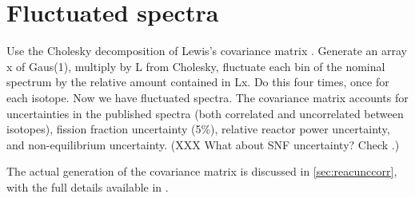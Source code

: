 \documentclass[../thesis.tex]{subfiles}
\begin{document}
\section{Fluctuated spectra}
\label{sec:reactoyFluct}

Use the Cholesky decomposition of Lewis's covariance matrix
\cite{Lewis}. Generate an array x of Gaus(1), multiply by L from Cholesky,
fluctuate each bin of the nominal spectrum by the relative amount contained in
Lx. Do this four times, once for each isotope. Now we have fluctuated
spectra. The covariance matrix accounts for uncertainties in the published
spectra (both correlated and uncorrelated between isotopes), fission fraction
uncertainty (5\%), relative reactor power uncertainty, and non-equilibrium
uncertainty. (XXX What about SNF uncertainty? Check \cite{Lewis}.)

The actual generation of the covariance matrix is discussed in
\autoref{sec:reacunccorr}, with the full details available in \cite{Lewis}.
\end{document}
